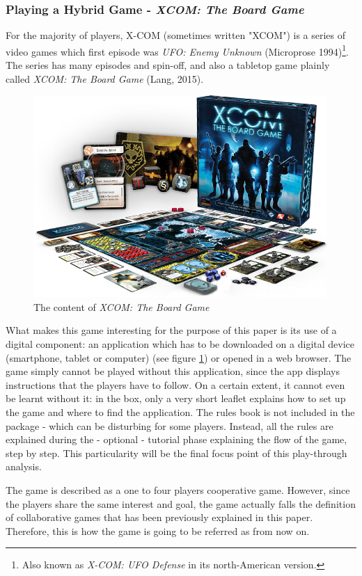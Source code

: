 \subsubsection{Playing a Hybrid Game - \textit{XCOM: The Board Game}}
For the majority of players, X-COM (sometimes written "XCOM") is a series of video games which first episode was \textit{UFO: Enemy Unknown}\cite{game:xcom} (Microprose 1994)\footnote{Also known as \textit{X-COM: UFO Defense} in its north-American version.}. The series has many episodes and spin-off, and also a tabletop game plainly called \textit{XCOM: The Board Game} (Lang, 2015)\cite{game:xcomtbg}.

\begin{figure}[h]
    \centering
    \includegraphics[scale=0.5]{Images/xc01_layout.png}
    \caption{The content of \textit{XCOM: The Board Game}}
    \label{fig:XCOMBG}
\end{figure}

What makes this game interesting for the purpose of this paper is its use of a digital component: an application which has to be downloaded on a digital device (smartphone, tablet or computer) (see figure \ref{fig:XCOMBG}) or opened in a web browser. The game simply cannot be played without this application, since the app displays instructions that the players have to follow. On a certain extent, it cannot even be learnt without it: in the box, only a very short leaflet explains how to set up the game and where to find the application. The rules book is not included in the package - which can be disturbing for some players. Instead, all the rules are explained during the - optional - tutorial phase explaining the flow of the game, step by step. This particularity will be the final focus point of this play-through analysis.

The game is described as a one to four players cooperative game. However, since the players share the same interest and goal, the game actually falls the definition of collaborative games that has been previously explained in this paper. Therefore, this is how the game is going to be referred as from now on.


